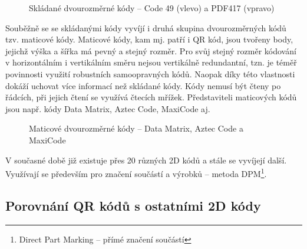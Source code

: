 \begin{figure}[H]
  \begin{center}
    \caption{Skládané dvourozměrné kódy -- Code 49 (vlevo) a PDF417 (vpravo)
    \cite{codeGenerator}}
    \label{stackedCodes}
  \end{center}
\end{figure}

Souběžně se se skládanými kódy vyvíjí i druhá skupina dvourozměrných kódů tzv. 
maticové kódy. Maticové kódy, kam mj. patří i QR kód, jsou tvořeny body, jejichž 
výška a šířka má pevný a stejný rozměr. Pro svůj stejný rozměr kódování 
v horizontálním i vertikálním směru nejsou vertikálně redundantní, tzn. je 
téměř povinnosti využití robustních samoopravných kódů. Naopak díky této 
vlastnosti dokáží uchovat více informací než skládané kódy. Kódy nemusí být 
čteny po řádcích, při jejich čtení se využívá čtecích mřížek. Představiteli 
maticových kódů jsou např. kódy Data Matrix, Aztec Code, MaxiCode aj.
\cite{automatizaceClanek}
             
\begin{figure}[H]
  \begin{center}
    \caption{Maticové dvourozměrné kódy -- Data Matrix, Aztec Code a MaxiCode
    \cite{codeGenerator}}
    \label{matrixCodes}
  \end{center}
\end{figure}              

V současné době již existuje přes 20 různých 2D kódů a stále se vyvíjejí další.
Využívají se především pro značení součástí a výrobků – metoda
DPM\footnote{Direct Part Marking -- přímé značení součástí}.
\cite{automatizaceClanek}


\subsection{Porovnání QR kódů s ostatními 2D kódy}
\label{porovnani2DKoduSQRKody}

